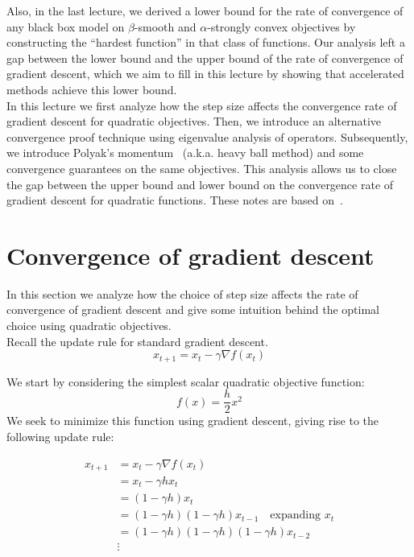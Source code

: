 \documentclass{article}
\begin{document}
Also, in the last lecture, we derived a lower bound for the rate of convergence of any black box model on $\beta$-smooth and $\alpha$-strongly convex objectives by constructing the ``hardest function'' in that class of functions. 
Our analysis left a gap between the lower bound and the upper bound of the rate of convergence of gradient descent, which we aim to fill in this lecture by showing that accelerated methods achieve this lower bound.
\\
 
In this lecture we first analyze how the step size affects the convergence rate of gradient descent for quadratic objectives. 
Then, we introduce an alternative convergence proof technique using eigenvalue analysis of operators.
Subsequently, we introduce Polyak's momentum~\cite{polyak1964some} (a.k.a. heavy ball method) and some convergence guarantees on the same objectives. This analysis allows us to close the gap between the upper bound and lower bound on the convergence rate of gradient descent for quadratic functions. These notes are based on~\cite{goh2017why, zhang2017yellowfin, nesterov1998introductory}.

\section{Convergence of gradient descent}

In this section we analyze how the choice of step size affects the rate of convergence of gradient descent and give some intuition behind the optimal choice using quadratic objectives.
\\

Recall the update rule for standard gradient descent.
\begin{equation}
x_{t+1}=x_t - \gamma \nabla f(x_t)
\end{equation}

We start by considering the simplest scalar quadratic objective function:
\begin{equation}
	f(x) = \frac{h}{2} x^2
\end{equation}
We seek to minimize this function using gradient descent, giving rise to the following update rule:

\begin{align*}
	x_{t+1} &=x_t - \gamma \nabla f(x_t) \\
            &= x_t -\gamma h x_t \\
            &=(1 - \gamma h) x_t \\
            &=(1 - \gamma h) (1 - \gamma h) x_{t - 1} \quad \text{expanding $x_t$} \\
            &=(1 - \gamma h)(1 - \gamma h)(1 - \gamma h) x_{t - 2} \\
            &\vdots
\end{align*}
\end{document}
